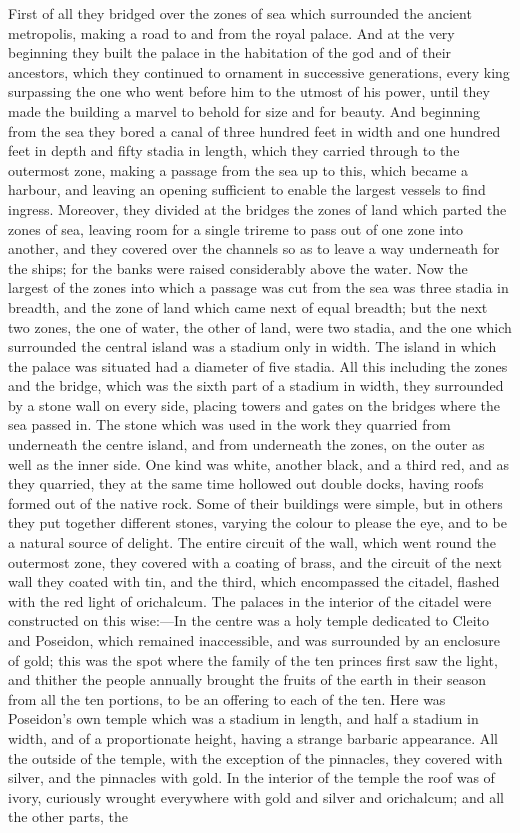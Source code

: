 \documentclass[11pt,letter]{article}
\begin{document}
\par  First of all they bridged over the zones of sea which surrounded the ancient metropolis, making a road to and from the royal palace. And at the very beginning they built the palace in the habitation of the god and of their ancestors, which they continued to ornament in successive generations, every king surpassing the one who went before him to the utmost of his power, until they made the building a marvel to behold for size and for beauty. And beginning from the sea they bored a canal of three hundred feet in width and one hundred feet in depth and fifty stadia in length, which they carried through to the outermost zone, making a passage from the sea up to this, which became a harbour, and leaving an opening sufficient to enable the largest vessels to find ingress. Moreover, they divided at the bridges the zones of land which parted the zones of sea, leaving room for a single trireme to pass out of one zone into another, and they covered over the channels so as to leave a way underneath for the ships; for the banks were raised considerably above the water. Now the largest of the zones into which a passage was cut from the sea was three stadia in breadth, and the zone of land which came next of equal breadth; but the next two zones, the one of water, the other of land, were two stadia, and the one which surrounded the central island was a stadium only in width. The island in which the palace was situated had a diameter of five stadia. All this including the zones and the bridge, which was the sixth part of a stadium in width, they surrounded by a stone wall on every side, placing towers and gates on the bridges where the sea passed in. The stone which was used in the work they quarried from underneath the centre island, and from underneath the zones, on the outer as well as the inner side. One kind was white, another black, and a third red, and as they quarried, they at the same time hollowed out double docks, having roofs formed out of the native rock. Some of their buildings were simple, but in others they put together different stones, varying the colour to please the eye, and to be a natural source of delight. The entire circuit of the wall, which went round the outermost zone, they covered with a coating of brass, and the circuit of the next wall they coated with tin, and the third, which encompassed the citadel, flashed with the red light of orichalcum. The palaces in the interior of the citadel were constructed on this wise:—In the centre was a holy temple dedicated to Cleito and Poseidon, which remained inaccessible, and was surrounded by an enclosure of gold; this was the spot where the family of the ten princes first saw the light, and thither the people annually brought the fruits of the earth in their season from all the ten portions, to be an offering to each of the ten. Here was Poseidon's own temple which was a stadium in length, and half a stadium in width, and of a proportionate height, having a strange barbaric appearance. All the outside of the temple, with the exception of the pinnacles, they covered with silver, and the pinnacles with gold. In the interior of the temple the roof was of ivory, curiously wrought everywhere with gold and silver and orichalcum; and all the other parts, the 
\end{document}
